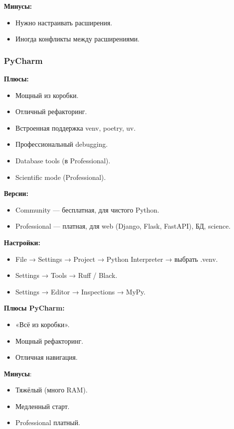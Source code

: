 \textbf{Минусы:}
\begin{itemize}
\item Нужно настраивать расширения.
\item Иногда конфликты между расширениями.
\end{itemize}

\subsubsection{PyCharm}

\textbf{Плюсы:}
\begin{itemize}
\item Мощный из коробки.
\item Отличный рефакторинг.
\item Встроенная поддержка venv, poetry, uv.
\item Профессиональный debugging.
\item Database tools (в Professional).
\item Scientific mode (Professional).
\end{itemize}

\textbf{Версии:}
\begin{itemize}
\item Community — бесплатная, для чистого Python.
\item Professional — платная, для web (Django, Flask, FastAPI), БД, science.
\end{itemize}

\textbf{Настройки:}
\begin{itemize}
\item File → Settings → Project → Python Interpreter → выбрать .venv.
\item Settings → Tools → Ruff / Black.
\item Settings → Editor → Inspections → MyPy.
\end{itemize}
\textbf{Плюсы PyCharm:}
\begin{itemize}
\item «Всё из коробки».
\item Мощный рефакторинг.
\item Отличная навигация.
\end{itemize}
\textbf{Минусы}:
\begin{itemize}
\item Тяжёлый (много RAM).
\item Медленный старт.
\item Professional платный.
\end{itemize}

